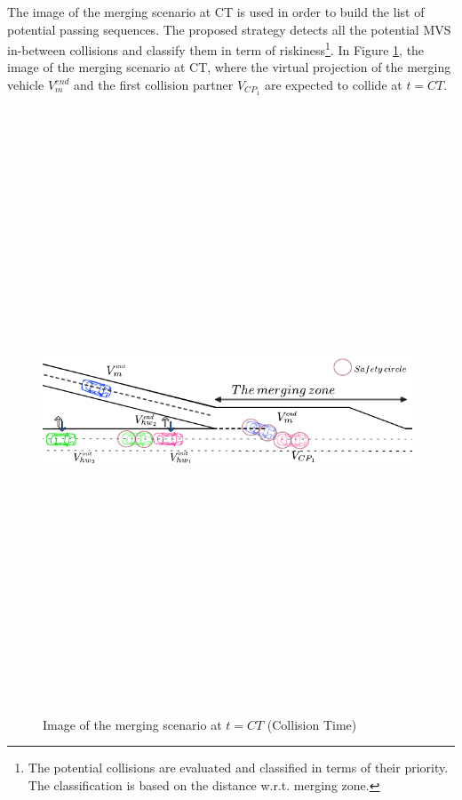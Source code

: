 The image of the merging scenario at CT is used in order to build the list of potential passing sequences. The proposed strategy detects all the potential MVS in-between collisions and classify them in term of riskiness\footnote{The potential collisions are evaluated and classified in terms of their priority. The classification is based on the distance w.r.t. merging zone.}. In Figure \ref{fig:Collision}, the image of the merging scenario at CT, where the virtual projection of the merging vehicle $V_m^{end}$ and the first collision partner $V_{CP_{1}}$ are expected to collide at $t=CT$. 

     \begin{figure}[!h]
        \centering 
        \includegraphics[width=11cm,height=18cm,keepaspectratio]{chapters/Chapitre_6/Figures/Collision.pdf}
        \caption{Image of the merging scenario at $t=CT$ (Collision Time)}
        \label{fig:Collision}
        \end{figure}





